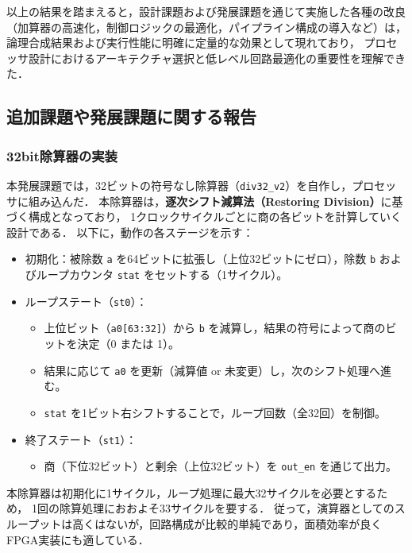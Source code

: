 \documentclass[autodetect-engine,dvi=dvipdfmx,ja=standard,
               a4j,11pt]{bxjsarticle}
\begin{document}
以上の結果を踏まえると，設計課題および発展課題を通じて実施した各種の改良
（加算器の高速化，制御ロジックの最適化，パイプライン構成の導入など）は，
論理合成結果および実行性能に明確に定量的な効果として現れており，
プロセッサ設計におけるアーキテクチャ選択と低レベル回路最適化の重要性を理解できた．

     
\subsection{追加課題や発展課題に関する報告}\label{tuika_hatten}
\subsubsection{32bit除算器の実装}
本発展課題では，32ビットの符号なし除算器（\texttt{div32\_v2}）を自作し，プロセッサに組み込んだ．
本除算器は，\textbf{逐次シフト減算法（Restoring Division）}に基づく構成となっており，
1クロックサイクルごとに商の各ビットを計算していく設計である．
以下に，動作の各ステージを示す：

\begin{itemize}
  \item 初期化：被除数 \texttt{a} を64ビットに拡張し（上位32ビットにゼロ），除数 \texttt{b} およびループカウンタ \texttt{stat} をセットする（1サイクル）。
  \item ループステート（\texttt{st0}）：
  \begin{itemize}
    \item 上位ビット（\texttt{a0[63:32]}）から \texttt{b} を減算し，結果の符号によって商のビットを決定（0 または 1）。
    \item 結果に応じて \texttt{a0} を更新（減算値 or 未変更）し，次のシフト処理へ進む。
    \item \texttt{stat} を1ビット右シフトすることで，ループ回数（全32回）を制御。
  \end{itemize}
  \item 終了ステート（\texttt{st1}）：
  \begin{itemize}
    \item 商（下位32ビット）と剰余（上位32ビット）を \texttt{out\_en} を通じて出力。
  \end{itemize}
\end{itemize}
本除算器は初期化に1サイクル，ループ処理に最大32サイクルを必要とするため，
1回の除算処理におおよそ33サイクルを要する．
従って，演算器としてのスループットは高くはないが，回路構成が比較的単純であり，面積効率が良くFPGA実装にも適している．
\end{document}
